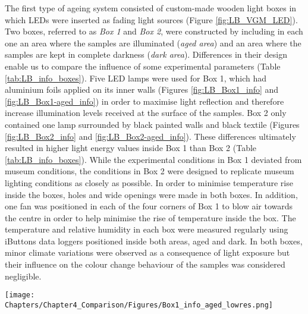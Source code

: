 The first type of ageing system consisted of custom-made wooden light boxes in which LEDs were inserted as fading light sources (Figure \ref{fig:LB_VGM_LED}). Two boxes, referred to as \textit{Box 1} and \textit{Box 2}, were constructed by including in each one an area where the samples are illuminated (\textit{aged area}) and an area where the samples are kept in complete darkness (\textit{dark area}). Differences in their design enable us to compare the influence of some experimental parameters (Table \ref{tab:LB_info_boxes}). Five \gls{LED} lamps were used for Box 1, which had aluminium foils applied on its inner walls (Figures \ref{fig:LB_Box1_info} and \ref{fig:LB_Box1-aged_info}) in order to maximise light reflection and therefore increase illumination levels received at the surface of the samples. Box 2 only contained one lamp surrounded by black painted walls and black textile (Figures \ref{fig:LB_Box2_info} and \ref{fig:LB_Box2-aged_info}). These differences ultimately resulted in higher light energy values inside Box 1 than Box 2 (Table \ref{tab:LB_info_boxes}). While the experimental conditions in Box 1 deviated from museum conditions, the conditions in Box 2 were designed to replicate museum lighting conditions as closely as possible. In order to minimise temperature rise inside the boxes, holes and wide openings were made in both boxes. In addition, one fan was positioned in each of the four corners of Box 1 to blow air towards the centre in order to help minimise the rise of temperature inside the box. The temperature and relative humidity in each box were measured regularly using iButtons\textsuperscript{\textregistered} data loggers positioned inside both areas, aged and dark. In both boxes, minor climate variations were observed as a consequence of light exposure but their influence on the colour change behaviour of the samples was considered negligible.

\begin{figure*}
\texttt{[image: Chapters/Chapter4\_Comparison/Figures/Box1\_info\_aged\_lowres.png]}
\caption[\hspace{0.3cm}Description of the illuminated area of Box 1]{Description of the illuminated area of Box 1: (a) irradiance mapping; (b) position of the samples and other elements; (c) photograph.}
\label{fig:LB_Box1-aged_info}
\end{figure*}


